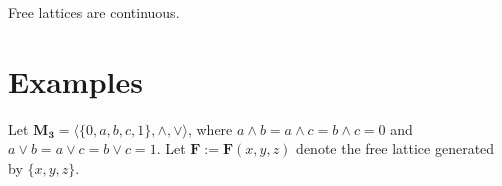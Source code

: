 \begin{theorem}
  Free lattices are continuous.
\end{theorem}

\newpage

\section{Examples}

Let $\mathbf{M_3} = \langle \{0, a, b, c, 1\}, \wedge, \vee\rangle$, where $a \wedge b = a \wedge c = b \wedge c = 0$ and $a \vee b = a \vee c = b \vee c = 1.$ Let $\mathbf F := \mathbf F(x, y, z)$ denote the free lattice generated by $\{x, y, z\}$.

